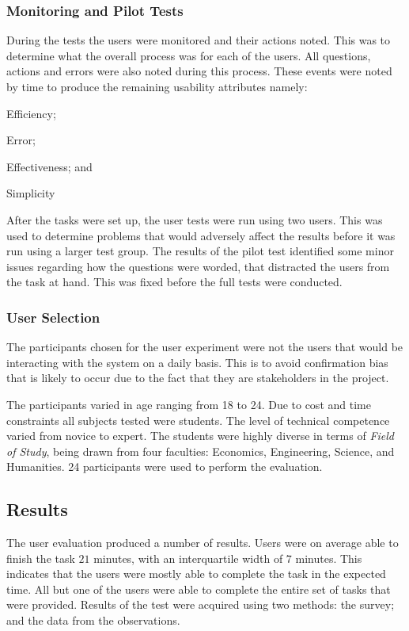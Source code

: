 \subsubsection{Monitoring and Pilot Tests}
During the tests the users were monitored and their actions noted. This was to
determine what the overall process was for each of the users. All
questions, actions and errors were also noted during this process. These events
were noted by time to produce the remaining usability attributes namely:
\begin{inparaenum}[(i)]\item Efficiency; \item Error; \item Effectiveness; and \item
Simplicity  \end{inparaenum}

After the tasks were set up, the user tests were run using two users. This was
used to determine problems that would adversely affect the results before it was
run using a larger test group. The results of the pilot test identified some
minor issues regarding how the questions were worded, that distracted the users
from the task at hand. This was fixed before the full tests were conducted.

\subsubsection{User Selection}
The participants chosen for the user experiment were not the users that would
be interacting with the system on a daily basis. This is to avoid confirmation
bias that is likely to occur due to the fact that they are stakeholders in the
project\cite{kaptchuk2003effect}. 

The participants varied in age ranging from 18 to 24. Due to cost and time
constraints all subjects tested were students. The level of
technical competence varied from novice to expert. The students were highly
diverse in terms of \emph{Field of Study}, being drawn from four faculties:
Economics, Engineering, Science, and Humanities. 24 participants were used 
to perform the evaluation.

\subsection{Results}
The user evaluation produced a number of results. Users were on average able to
finish the task $21$ minutes, with an interquartile width of
$7$ minutes. This indicates that the users were mostly able to complete the task
in the expected time. All but one of the users were able to complete the
entire set of tasks that were provided. Results of the test were acquired using two
methods: the survey; and the data from the observations.

